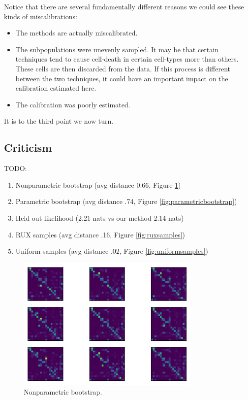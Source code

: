 Notice that there are several fundamentally different reasons we could see these kinds of miscalibrations:

\begin{itemize}
    \item The methods are actually miscalibrated.
    \item The subpopulations were unevenly sampled.  It may be that certain techniques tend to cause cell-death in certain cell-types more than others.  These cells are then discarded from the data.  If this process is different between the two techniques, it could have an important impact on the calibration estimated here.
    \item The calibration was poorly estimated.
\end{itemize}

It is to the third point we now turn.

\subsection{Criticism}

TODO:
\begin{enumerate}
\item Nonparametric bootstrap (avg distance 0.66, Figure \ref{fig:nonparametricbootstrap})
\item Parametric bootstrap (avg distance .74, Figure \ref{fig:parametricbootstrap})
\item Held out likelihood (2.21 nats vs our method 2.14 nats)
\item RUX samples (avg distance .16, Figure \ref{fig:ruxsamples})
\item Uniform samples (avg distance .02, Figure \ref{fig:uniformsamples})
\end{enumerate}

\begin{figure}
\includegraphics[width=0.8\textwidth]{../images/nonparametricbootstrap}
\caption{Nonparametric bootstrap.\label{fig:nonparametricbootstrap}}
\end{figure}

